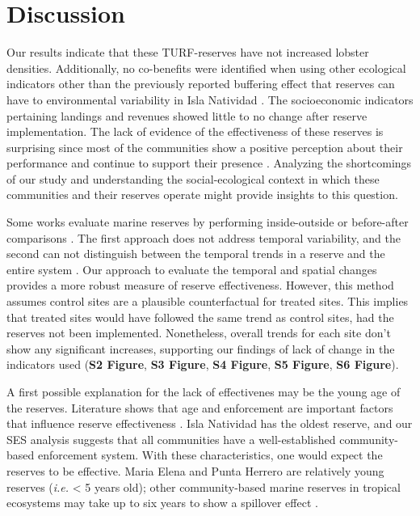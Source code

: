 \documentclass{frontiersSCNS}
\begin{document}
\clearpage

\section{Discussion}\label{discussion}

Our results indicate that these TURF-reserves have not increased lobster
densities. Additionally, no co-benefits were identified when using other
ecological indicators other than the previously reported buffering
effect that reserves can have to environmental variability in Isla
Natividad \citep{micheli_2012-EU}. The socioeconomic indicators
pertaining landings and revenues showed little to no change after
reserve implementation. The lack of evidence of the effectiveness of
these reserves is surprising since most of the communities show a
positive perception about their performance and continue to support
their presence \citep{ayer_2018}. Analyzing the shortcomings of our
study and understanding the social-ecological context in which these
communities and their reserves operate might provide insights to this
question.

Some works evaluate marine reserves by performing inside-outside
\citep{guidetti_2014-8Z,friedlander_2017-oI,rodriguez_2017-PD} or
before-after comparisons \citep{betti_2017-lq}. The first approach does
not address temporal variability, and the second can not distinguish
between the temporal trends in a reserve and the entire system
\citep{depalma_2018}. Our approach to evaluate the temporal and spatial
changes provides a more robust measure of reserve effectiveness.
However, this method assumes control sites are a plausible
counterfactual for treated sites. This implies that treated sites would
have followed the same trend as control sites, had the reserves not been
implemented. Nonetheless, overall trends for each site don't show any
significant increases, supporting our findings of lack of change in the
indicators used (\textbf{S2 Figure}, \textbf{S3 Figure}, \textbf{S4
Figure}, \textbf{S5 Figure}, \textbf{S6 Figure}).

A first possible explanation for the lack of effectivenes may be the
young age of the reserves. Literature shows that age and enforcement are
important factors that influence reserve effectiveness
\citep{edgar_2014-UO}. Isla Natividad has the oldest reserve, and our
SES analysis suggests that all communities have a well-established
community-based enforcement system. With these characteristics, one
would expect the reserves to be effective. Maria Elena and Punta Herrero
are relatively young reserves (\emph{i.e.} \textless{} 5 years old);
other community-based marine reserves in tropical ecosystems may take up
to six years to show a spillover effect \citep{dasilva_2015-zX}.
\end{document}
